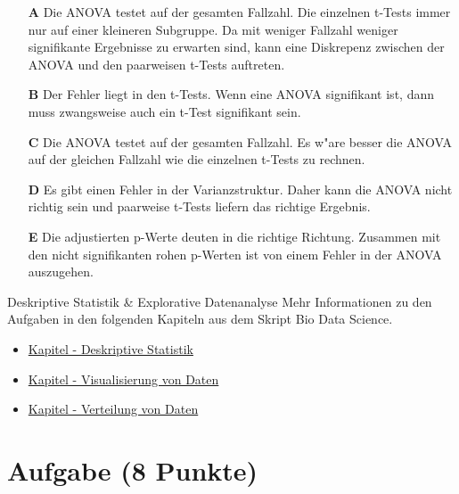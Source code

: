 \documentclass[a4paper, 9pt]{scrartcl}\usepackage[]{graphicx}\usepackage[]{xcolor}
\begin{document}
\begin{enumerate}
\item [\textbf{A} \msquare] Die ANOVA testet auf der gesamten Fallzahl. Die einzelnen t-Tests immer nur auf einer kleineren Subgruppe. Da mit weniger Fallzahl weniger signifikante Ergebnisse zu erwarten sind, kann eine Diskrepenz zwischen der ANOVA und den paarweisen t-Tests auftreten.
\item [\textbf{B} \msquare] Der Fehler liegt in den t-Tests. Wenn eine ANOVA signifikant ist, dann muss zwangsweise auch ein t-Test signifikant sein.
\item [\textbf{C} \msquare] Die ANOVA testet auf der gesamten Fallzahl. Es w{"a}re besser die ANOVA auf der gleichen Fallzahl wie die einzelnen t-Tests zu rechnen.
\item [\textbf{D} \msquare] Es gibt einen Fehler in der Varianzstruktur. Daher kann die ANOVA nicht richtig sein und paarweise t-Tests liefern das richtige Ergebnis.
\item [\textbf{E} \msquare] Die adjustierten p-Werte deuten in die richtige Richtung. Zusammen mit den nicht signifikanten rohen p-Werten ist von einem Fehler in der ANOVA auszugehen.
\end{enumerate}
    
\clearpage
\begin{graybox}{Deskriptive Statistik \& Explorative Datenanalyse}
Mehr Informationen zu den Aufgaben in den folgenden Kapiteln aus dem Skript Bio Data Science.
  \begin{itemize}
  \item \href{https://jkruppa.github.io/eda-descriptive.html}{Kapitel - Deskriptive Statistik}
  \item \href{https://jkruppa.github.io/eda-ggplot.html}{Kapitel - Visualisierung von Daten}
  \item \href{https://jkruppa.github.io/eda-distribution.html}{Kapitel - Verteilung von Daten}
  \end{itemize}
\end{graybox}
\clearpage

\section{Aufgabe \hfill (8 Punkte)}
\end{document}
